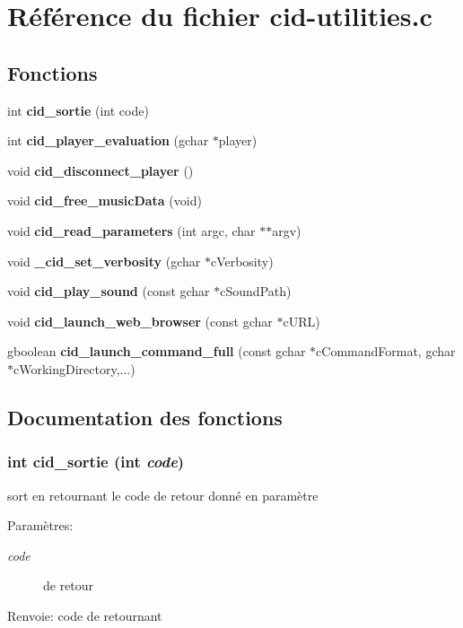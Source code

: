 \section{Référence du fichier cid-utilities.c}
\label{cid-utilities_8c}
\subsection*{Fonctions}
\begin{CompactItemize}
\item 
int {\bf cid\_\-sortie} (int code)
\item 
int {\bf cid\_\-player\_\-evaluation} (gchar $\ast$player)
\item 
void {\bf cid\_\-disconnect\_\-player} ()
\item 
void {\bf cid\_\-free\_\-musicData} (void)
\item 
void {\bf cid\_\-read\_\-parameters} (int argc, char $\ast$$\ast$argv)
\item 
void {\bf \_\-cid\_\-set\_\-verbosity} (gchar $\ast$cVerbosity)
\item 
void {\bf cid\_\-play\_\-sound} (const gchar $\ast$cSoundPath)
\item 
void {\bf cid\_\-launch\_\-web\_\-browser} (const gchar $\ast$cURL)
\item 
gboolean {\bf cid\_\-launch\_\-command\_\-full} (const gchar $\ast$cCommandFormat, gchar $\ast$cWorkingDirectory,...)
\end{CompactItemize}


\subsection{Documentation des fonctions}
\subsubsection{\setlength{\rightskip}{0pt plus 5cm}int cid\_\-sortie (int {\em code})}\label{cid-utilities_8c_0b42fafb55fca67d4be22d8095e5d1b4}


sort en retournant le code de retour donné en paramètre \begin{Desc}
\item[Paramètres:]
\begin{description}
\item[{\em code}]de retour \end{description}
\end{Desc}
\begin{Desc}
\item[Renvoie:]code de retournant \end{Desc}


